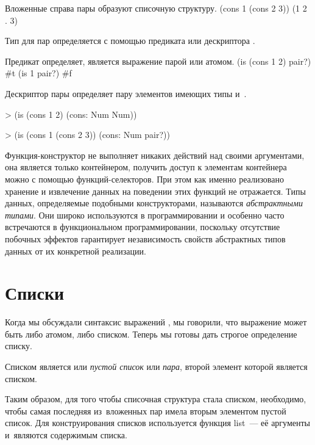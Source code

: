 \begin{example}{%
Вложенные справа пары образуют списочную структуру.}
\REPL
  {(cons 1 (cons 2 3))}
  {(1 2 . 3)}
\end{example}

Тип для пар определяется с помощью предиката  или дескриптора .

\begin{example}{%
Предикат  определяет, является выражение парой или атомом.}
\REPL
  {(is (cons 1 2) pair?)}
  {\#t}
\REPL
  {(is 1 pair?)}
  {\#f}
\end{example}

\begin{example}{%
Дескриптор пары  определяет пару элементов имеющих типы  и~.}
\begin{ExampleCode}
> (is (cons 1 2) 
      (cons: Num Num))
\end{ExampleCode}
\begin{ExampleCode}
> (is (cons 1 (cons 2 3)) 
      (cons: Num pair?))
\end{ExampleCode}
\end{example}
 
Функция-конструктор  не выполняет никаких действий над своими аргументами, она является только контейнером, получить доступ к элементам контейнера можно с помощью функций-селекторов. При этом как именно реализовано хранение и извлечение данных на поведении этих функций не отражается. Типы данных, определяемые подобными конструкторами, называются \emph{абстрактными типами}. Они широко используются в программировании и особенно часто встречаются в функциональном программировании, поскольку отсутствие побочных эффектов гарантирует независимость свойств абстрактных типов данных от их конкретной реализации.

\section[2]{Списки}%
%
Когда мы обсуждали синтаксис выражений \Scheme, мы говорили, что выражение может быть либо атомом, либо списком. Теперь мы готовы дать строгое определение списку.

Списком является или \emph{пустой список}  или \emph{пара}, второй элемент которой является списком. 

Таким образом, для того чтобы списочная структура стала списком, необходимо, чтобы самая последняя из~вложенных пар имела вторым элементом пустой список. Для конструирования списков используется функция \si{list}~--- её аргументы и~являются содержимым списка.


